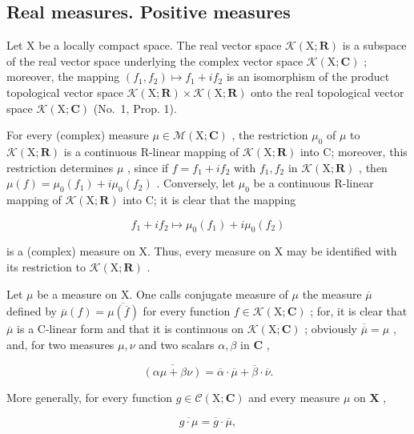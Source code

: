 \subsection{Real measures. Positive measures}

Let X be a locally compact space. The real vector space \(\mathcal{K}(\mathrm{X};\mathbf{R})\) is a subspace of the real vector space underlying the complex vector space \(\mathcal{K}(\mathrm{X};\mathbf{C})\) ; moreover, the mapping \((f_{1},f_{2})\mapsto f_{1}+if_{2}\) is an isomorphism of the product topological vector space \(\mathcal{K}(\mathrm{X};\mathbf{R})\times\mathcal{K}(\mathrm{X};\mathbf{R})\) onto the real topological vector space \(\mathcal{K}(\mathrm{X};\mathbf{C})\) (No.~1, Prop. 1).

For every (complex) measure \(\mu\in\mathcal{M}(\mathrm{X};\mathbf{C})\) , the restriction \(\mu_{0}\) of \(\mu\) to \(\mathcal{K}(\mathrm{X};\mathbf{R})\) is a continuous R-linear mapping of \(\mathcal{K}(\mathrm{X};\mathbf{R})\) into C; moreover, this restriction determines \(\mu\) , since if \(f=f_{1}+if_{2}\) with \(f_{1},f_{2}\) in \(\mathcal{K}(\mathrm{X};\mathbf{R})\) , then \(\mu(f)=\mu_{0}(f_{1})+i\mu_{0}(f_{2})\) . Conversely, let \(\mu_{0}\) be a continuous R-linear mapping of \(\mathcal{K}(\mathrm{X};\mathbf{R})\) into C; it is clear that the mapping

\[
f _ {1} + i f _ {2} \mapsto \mu_ {0} (f _ {1}) + i \mu_ {0} (f _ {2})
\]

is a (complex) measure on X. Thus, every measure on X may be identified with its restriction to \(\mathcal{K}(\mathrm{X};\mathbf{R})\) .

Let \(\mu\) be a measure on X. One calls conjugate measure of \(\mu\) the measure \(\overline{\mu}\) defined by \(\overline{\mu}(f) = \overline{\mu(\overline{f})}\) for every function \(f \in \mathcal{K}(\mathrm{X};\mathbf{C})\) ; for, it is clear that \(\overline{\mu}\) is a C-linear form and that it is continuous on \(\mathcal{K}(\mathrm{X};\mathbf{C})\) ; obviously \(\overline{\overline{\mu}} = \mu\) , and, for two measures \(\mu, \nu\) and two scalars \(\alpha, \beta\) in \(\mathbf{C}\) ,

\[
\overline {{(\alpha \mu + \beta \nu)}} = \overline {{\alpha}} \cdot \overline {{\mu}} + \overline {{\beta}} \cdot \overline {{\nu}}.
\]

More generally, for every function \(g \in \mathcal{C}(\mathrm{X};\mathbf{C})\) and every measure \(\mu\) on \(\mathbf{X}\) ,

\[
\overline {{{g \cdot \mu}}} = \overline {{{g}}} \cdot \overline {{{\mu}}},\tag{7}
\]

